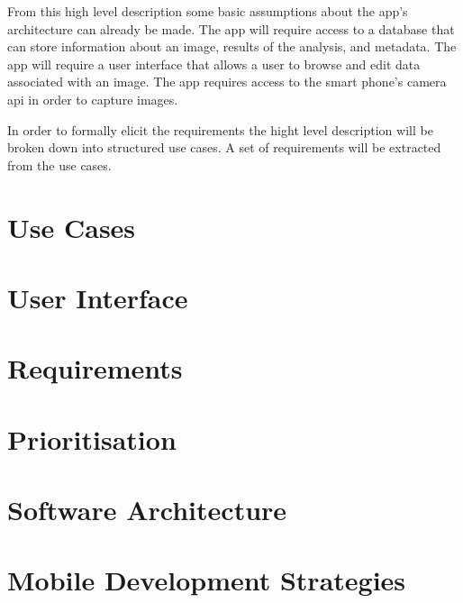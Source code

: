 From this high level description some basic assumptions about the app’s architecture can already be made. The app will require access to a database that can store information about an image, results of the analysis, and metadata. The app will require a user interface that allows a user to browse and edit data associated with an image. The app requires access to the smart phone’s camera api in order to capture images.

In order to formally elicit the requirements the hight level description will be broken down into structured use cases. A set of requirements will be extracted from the use cases.

\section{Use Cases}




\section{User Interface}


\section{Requirements}














\section{Prioritisation}


\section{Software Architecture}


\section{Mobile Development Strategies}

